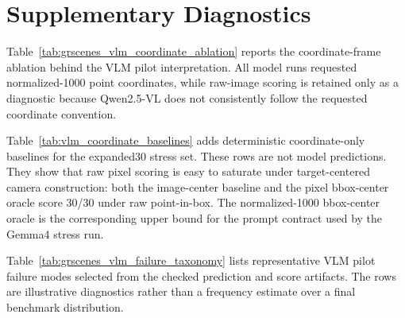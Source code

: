 \appendix
\section{Supplementary Diagnostics}
\label{sec:appendix}

Table~\ref{tab:grscenes_vlm_coordinate_ablation} reports the coordinate-frame
ablation behind the VLM pilot interpretation. All model runs requested
normalized-1000 point coordinates, while raw-image scoring is retained only as
a diagnostic because Qwen2.5-VL does not consistently follow the requested
coordinate convention.



Table~\ref{tab:vlm_coordinate_baselines} adds deterministic coordinate-only
baselines for the expanded30 stress set. These rows are not model predictions.
They show that raw pixel scoring is easy to saturate under target-centered
camera construction: both the image-center baseline and the pixel bbox-center
oracle score 30/30 under raw point-in-box. The normalized-1000 bbox-center
oracle is the corresponding upper bound for the prompt contract used by the
Gemma4 stress run.



Table~\ref{tab:grscenes_vlm_failure_taxonomy} lists representative VLM pilot
failure modes selected from the checked prediction and score artifacts. The
rows are illustrative diagnostics rather than a frequency estimate over a final
benchmark distribution.


